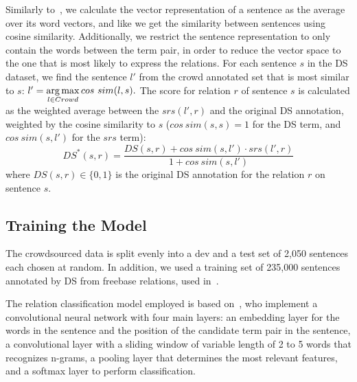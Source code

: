  Similarly to~\citet{sultan2015dls}, we calculate the vector representation of a sentence as the average over its word vectors, and like \citet{sterckx2016knowledge} we get the similarity between sentences using cosine similarity. Additionally, we restrict the sentence representation to only contain the words between the term pair, in order to reduce the vector space to the one that is most likely to express the relations. For each sentence $s$ in the DS dataset, we find the sentence $l'$ from the crowd annotated set that is most similar to $s$: $ l' = \operatorname*{arg\,max}\limits_{l \in Crowd} cos\ sim(l, s). $ The score for relation $r$ of sentence $s$ is calculated as the weighted average between the $srs(l', r)$ and the original DS annotation, weighted by the cosine similarity to $s$ ($ cos\ sim(s,s) = 1$ for the DS term, and $ cos\ sim(s, l')$ for the $srs$ term):
\begin{equation} \label{eq:ds_w2v}
DS^{*}(s, r) =  \dfrac{DS(s, r) +  cos\ sim(s, l') \cdot srs(l', r)}{1 +  cos\ sim(s, l')}
\end{equation}
\noindent where $DS(s, r) \in \{0,1\}$ is the original DS annotation for the relation $r$ on sentence $s$.


\subsection{Training the Model}
\label{sec:train}

The crowdsourced data is split evenly into a dev and a test set of 2,050 sentences each chosen at random. In addition, we used a training set of 235,000 sentences annotated by DS from freebase relations, used in~\citet{riedel2013relation}.

The relation classification model employed is based on~\citet{nguyen2015relation}, who implement a convolutional neural network with four main layers: an embedding layer for the words in the sentence and the position of the candidate term pair in the sentence, a convolutional layer with a sliding window of variable length of 2 to 5 words that recognizes n-grams, a pooling layer that determines the most relevant features, and a softmax layer to perform classification.

